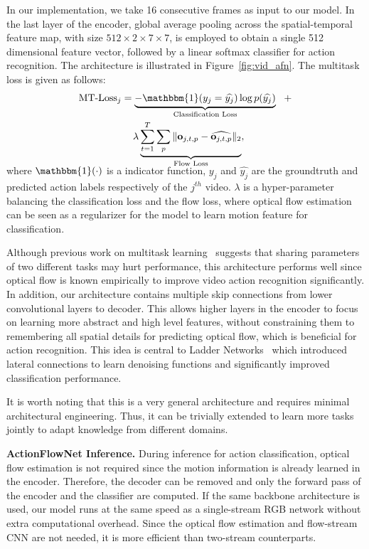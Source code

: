 \documentclass[10pt,twocolumn,letterpaper]{article}
\begin{document}
In our implementation, we take 16 consecutive frames as input to our model.
In the last layer of the encoder, global average pooling across the spatial-temporal feature map, with size $512 \times 2\times 7 \times 7$, is employed to obtain a single 512 dimensional feature vector, followed by a linear softmax classifier for action recognition.  The architecture is illustrated in Figure~\ref{fig:vid_afn}.
The multitask loss is given as follows:
\vspace{-1em}
\begin{multline} 
\text{MT-Loss}_{j} = \underbrace{-\mathbbm{1}(y_j = \widehat{y_j})\log p(\widehat{y_j})}_{\text{Classification Loss}}~~ +\\
    ~~\lambda \underbrace{\sum_{t=1}^T\sum_{p} \|\mathbf{o}_{j,t,p} - \widehat{\mathbf{o}_{j,t,p}} \|_2}_{\text{Flow Loss}},
\label{eq:multi_mt_loss}
  \vspace{-1em}
\end{multline}
where $\mathbbm{1}(\cdot)$ is a indicator function, $y_j$ and $\widehat{y_j}$ are the groundtruth and predicted action labels respectively of the $j^{th}$ video.
$\lambda$ is a hyper-parameter balancing the classification loss and the flow loss, where optical flow estimation can be seen as a regularizer for the model to learn motion feature for classification.

Although previous work on multitask learning~\cite{misraSGH16} suggests that sharing parameters of two different tasks may hurt performance, this architecture performs well since optical flow is known empirically to improve video action recognition significantly.
In addition, our architecture contains multiple skip connections from lower convolutional layers to decoder.
This allows higher layers in the encoder to focus on learning more abstract and high level features, without constraining them to remembering all spatial details for predicting optical flow, which is beneficial for action recognition.
This idea is central to Ladder Networks~\cite{rasmusVHBR15} which introduced lateral connections to learn denoising functions and significantly improved classification performance.

It is worth noting that this is a very general architecture and requires minimal architectural engineering.
Thus, it can be trivially extended to learn more tasks jointly to adapt knowledge from different domains.

\noindent\textbf{ActionFlowNet Inference.}
During inference for action classification, optical flow estimation is not required since the motion information is already learned in the encoder. Therefore, the decoder can be removed and only the forward pass of the encoder and the classifier are computed. If the same backbone architecture is used, our model runs at the same speed as a single-stream RGB network without extra computational overhead. Since the optical flow estimation and flow-stream CNN are not needed, it is more efficient than two-stream counterparts.
\end{document}
